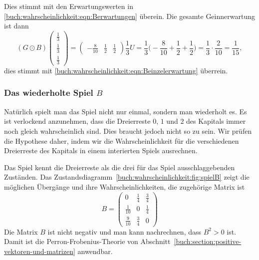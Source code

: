 Dies stimmt mit den Erwartungswerten in 
\eqref{buch:wahrscheinlichkeit:eqn:Berwartungen}
überein.
Die gesamte Geinnerwartung ist dann
\begin{equation}
(G\odot B)
\begin{pmatrix}\frac13\\\frac13\\\frac13\end{pmatrix}
=
\begin{pmatrix}-\frac{8}{10}&\frac12&\frac12\end{pmatrix}
\frac13U
=
\frac13\biggl(-\frac{8}{10}+\frac12+\frac12\biggr)
=
\frac13\cdot\frac{2}{10}
=
\frac{1}{15},
\label{buch:wahrscheinlichkeit:eqn:BodotEinzelerwartung}
\end{equation}
dies stimmt mit \eqref{buch:wahrscheinlichkeit:eqn:Beinzelerwartung}
überrein.

\subsubsection{Das wiederholte Spiel $B$}
Natürlich spielt man das Spiel nicht nur einmal, sondern man wiederholt es.
Es ist verlockend anzunehmen, dass die Dreierreste $0$, $1$ und $2$ des
Kapitals immer noch gleich wahrscheinlich sind.
Dies braucht jedoch nicht so zu sein.
Wir prüfen die Hypothese daher, indem wir die Wahrscheinlichkeit
für die verschiedenen Dreierreste des Kapitals in einem interierten
Spiels ausrechnen.

Das Spiel kennt die Dreierreste als die drei für das Spiel ausschlaggebenden
Zuständen.
Das Zustandsdiagramm~\ref{buch:wahrscheinlichkeit:fig:spielB} zeigt
die möglichen Übergänge und ihre Wahrscheinlichkeiten, die zugehörige
Matrix ist
\[
B
=
\begin{pmatrix}
0          &\frac14 &\frac34\\
\frac1{10} &0       &\frac14\\
\frac9{10} &\frac34 &0
\end{pmatrix}
\]
Die Matrix $B$ ist nicht negativ und man kann nachrechnen, dass $B^2>0$ ist.
Damit ist die Perron-Frobenius-Theorie von
Abschnitt~\ref{buch:section:positive-vektoren-und-matrizen}
anwendbar.

